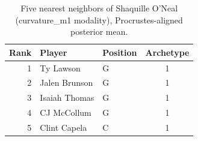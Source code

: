 \begin{table}[htbp]
  \centering\small
  \begin{tabular}{rllc}
    \toprule
    Rank & Player & Position & Archetype \\
    \midrule
    1 & Ty Lawson & G & 1 \\
    2 & Jalen Brunson & G & 1 \\
    3 & Isaiah Thomas & G & 1 \\
    4 & CJ McCollum & G & 1 \\
    5 & Clint Capela & C & 1 \\
    \bottomrule
  \end{tabular}
  \caption{Five nearest neighbors of Shaquille O'Neal (curvature_m1 modality), Procrustes-aligned posterior mean.}
  \label{tab:Shaquille_O_Neal_neighbors_curvature_m1}
\end{table}

